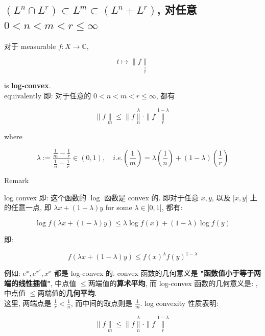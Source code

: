 \subsection{\texorpdfstring{\((L^{n} \cap L^{r}) \subset L^{m} \subset (L^{n} + L^{r})\), 对任意 \(0 < n < m < r \leq \infty\)}{(L\^{}\{n\} \textbackslash cap L\^{}\{r\}) \textbackslash subset L\^{}\{m\} \textbackslash subset (L\^{}\{n\} + L\^{}\{r\}), 对任意 0 \textless{} n \textless{} m \textless{} r \textbackslash leq \textbackslash infty}}

\begin{proposition}

对于 measurable \(f:X\rightarrow\mathbb{C}\),

\[t\mapsto \parallel f\underset{\frac{1}{t}}{\parallel}\]

is \textbf{log-convex}.\\
equivalently 即: 对于任意的 \(0 < n < m < r \leq \infty\), 都有

\[\parallel f\underset{m}{\parallel} \leq \parallel f\underset{n}{\overset{\lambda}{\parallel}} \cdot \parallel f\underset{r}{\overset{1 - \lambda}{\parallel}}\]

where

\[\lambda := \frac{\frac{1}{m} - \frac{1}{r}}{\frac{1}{n} - \frac{1}{r}} \in (0,1),\quad i.e.(\frac{1}{m}) = \lambda(\frac{1}{n}) + (1 - \lambda)(\frac{1}{r})\]

\end{proposition}

\begin{qlremark}{Remark}

log convex 即: 这个函数的 \(\log\) 函数是 convex 的. 即对于任意 \(x,y\), 以及 \(\lbrack x,y\rbrack\) 上的任意一点, 即 \(\lambda x + (1 - \lambda)y\) for some \(\lambda \in \lbrack 0,1\rbrack\), 都有:

\[\log f(\lambda x + (1 - \lambda)y) \leq \lambda\log f(x) + (1 - \lambda)\log f(y)\]

即:

\[f(\lambda x + (1 - \lambda)y) \leq f(x)^{\lambda}f(y)^{1 - \lambda}\]

例如: \(e^{x},e^{x^{2}},x^{x}\) 都是 log-convex 的. convex 函数的几何意义是 \textbf{"函数值小于等于两端的线性插值"}, 中点值 \(\leq\)两端值的\textbf{算术平均}, 而 log-convex 函数的几何意义是: , 中点值 \(\leq\)两端值的\textbf{几何平均}.\\
这里, 两端点是 \(\frac{1}{r} < \frac{1}{n}\), 而中间的取点则是 \(\frac{1}{m}\). log convexity 性质表明:

\[\parallel f\underset{m}{\parallel} \leq \parallel f\underset{n}{\overset{\lambda}{\parallel}} \cdot \parallel f\underset{r}{\overset{1 - \lambda}{\parallel}}\]

\end{qlremark}

